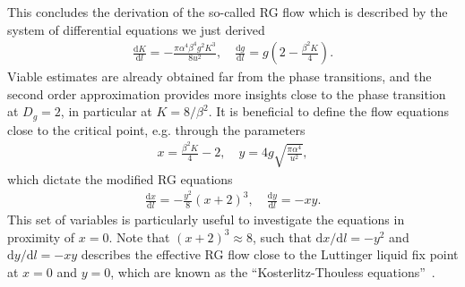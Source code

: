 \documentclass{svmono}
\def\rd{\mathrm d}
\newcommand{\brlr}[1]{\left( #1 \right)}
\begin{document}
This concludes the derivation of the so-called RG flow which is described by the system of differential equations we just derived
\begin{align}
    \frac{\rd K}{\rd l} = -\frac{\pi \alpha^4 \beta^4 g^2 K^3}{8u^2},
    \quad
    \frac{\rd g}{\rd l} = g\brlr{2-\frac{\beta^2K}4}.
\end{align}
Viable estimates are already obtained far from the phase transitions, and the second order approximation provides more insights close to the phase transition at $D_g=2$, in particular at $K=8/\beta^2$.
It is beneficial to define the flow equations close to the critical point, e.g. through the parameters
\begin{align}
    x = \frac{\beta^2 K}4 - 2,
    \quad
    y = 4g\sqrt{\frac{\pi\alpha^4}{u^2}},
\end{align}
which dictate the modified RG equations
\begin{align}
    \frac{\rd x}{\rd l} = -\frac{y^2}8(x+2)^3,
    \quad
    \frac{\rd y}{\rd l} = - xy.
\end{align}
This set of variables is particularly useful to investigate the equations in proximity of $x=0$.
Note that $(x+2)^3\approx8$, such that $\rd x/\rd l = -y^2$ and $\rd y/\rd l=-xy$ describes the effective RG flow close to the Luttinger liquid fix point at $x=0$ and $y=0$, which are known as the ``Kosterlitz-Thouless equations''~\cite{Kosterlitz1974,Kosterlitz1973}.
\end{document}

